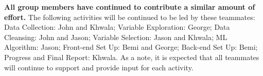 \documentclass[sigconf,nonacm,11pt]{acmart}
\begin{document}
\textbf{All group members have continued to contribute a similar amount of effort.} The following activities will be continued to be led by these teammates: Data Collection: John and Khwala; Variable Exploration: George; Data Cleansing: John and Jason; Variable Selection: Jason and Khwala; ML Algorithm: Jason; Front-end Set Up: Bemi and George; Back-end Set Up: Bemi; Progress and Final Report: Khwala. As a note, it is expected that all teammates will continue to support and provide input for each activity.


\end{document}

